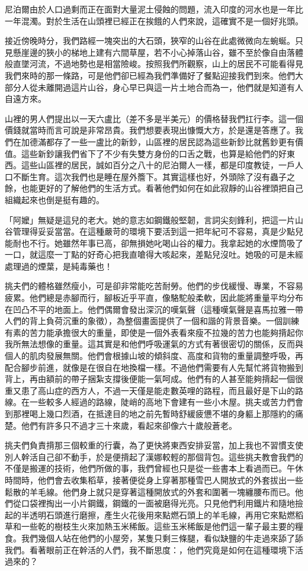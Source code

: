 尼泊爾由於人口過剩而正在面對大量泥土侵蝕的問題，流入印度的河水也是一年比一年混濁。對於生活在山頭裡已經正在挨餓的人們來說，這確實不是一個好兆頭。

接近傍晚時分，我們路經一塊突出的大石頭，狹窄的山谷在此處微微向左蜿蜒。只見懸崖邊的狹小的梯地上建有六間草屋，若不小心掉落山谷，雖不至於像自由落體般直墜河流，不過地勢也是相當險峻。按照我們所觀察，山上的居民不可能看得見我們來時的那一條路，可是他們卻已經為我們準備好了餐點迎接我們到來。他們大部分人從未離開過這片山谷，身心早已與這一片土地合而為一，他們就是知道有人自遠方來。

山裡的男人們提出以一天六盧比（差不多是半美元）的價格替我們扛行李。這一個價錢就當時而言可說是非常昂貴。我們想要表現出慷慨大方，於是還是答應了。我們在加德滿都存了一些一盧比的新鈔，山區裡的居民認為這些新鈔比就舊鈔更有價值。這些新鈔讓我們省下了不少有失雙方身份的口舌之戰，也算是給他們的好東西。這些山區裡的居民，誠如百分之八十的尼泊爾人一樣，都是印度教徒，一戶人口不斷生育。這次我們也是睡在屋外簷下。其實這樣也好，外頭除了沒有蟲子之餘，也能更好的了解他們的生活方式。看著他們如何在如此寂靜的山谷裡頭把自己組織起來也倒是挺有趣的。


「阿嬤」無疑是這兒的老大。她的意志如鋼鐵般堅韌，言詞尖刻鋒利，把這一片山谷管理得妥妥當當。在這種嚴苛的環境下要活到這一把年紀可不容易，真是少點兒能耐也不行。她雖然年事已高，卻無損她叱喝山谷的權力。我拿起她的水煙筒吸了一口，就這麼一丁點的好奇心把我直嗆得大咳起來，差點兒沒吐。她吸的可是未經處理過的煙葉，是純毒藥也！

挑夫們的體格雖然瘦小，可是卻非常能吃苦耐勞。他們的步伐緩慢、專業，不容易疲累。他們總是赤腳而行，腳板近乎平直，像駱駝般柔軟，因此能將重量平均分布在凹凸不平的地面上。他們偶爾會發出深沉的嘆氣聲（這種嘆氣聲是喜馬拉雅一帶人們的背上負荷沉重的象徵），為整個畫面提供了一個和諧的背景音樂。一個訓練有素的苦力能承擔很大的重量，即使是一個外表看來瘦不拉幾的苦力也能夠揹起你我所無法想像的重量。這其實是和他們呼吸運氣的方式有著很密切的關係，反而與個人的肌肉發展無關。他們會根據山坡的傾斜度、高度和貨物的重量調整呼吸，再配合腳步前進，就像是在很自在地換檔一樣。不過他們需要有人先幫忙將貨物搬到背上，再由額前的帶子捆紮支撐後便能一氣呵成。他們有的人甚至能夠揹起一個很重又患了高山症的西方人，不過一天僅是能走數英哩的路程，而且最好是下山的路線。在一些較多人經過的路線，陡峭的高地下會建有一些小木屋。挑夫或苦力們會到那裡喝上幾口烈酒，在抵達目的地之前先暫時舒緩疲憊不堪的身軀上那隱約的痛楚。他們有許多只不過才三十來歲，看起來卻像六十歲般蒼老。

挑夫們負責揹那三個較重的行囊，為了更快將東西安排妥當，加上我也不習慣支使別人幹活自己卻不動手，於是便揹起了漢娜較輕的那個背包。這些挑夫教會我們的不僅是搬運的技術，他們所做的事，我們曾經也只是從一些書本上看過而已。午休時間時，他們會去收集稻草，接著便從身上穿著那種雪巴人開放式的外套拔出一些鬆散的羊毛線。他們身上就只是穿著這種開放式的外套和圍著一塊纏腰布而已。他們從口袋裡掏出一小片鋼鐵，鋼鐵的一面被磨得光亮。只見他們利用鐵片和隨地撿起的半透明石頭進行磨擦，產生火花後用來點燃石頭上的羊毛線，再用它來點燃稻草和一些乾的樹枝生火來加熱玉米稀飯。這些玉米稀飯是他們這一輩子最主要的糧食。我們幾個人站在他們的小屋旁，某隻只剩三條腿，看似缺鹽的牛走過來舔了舔我們。看著眼前正在幹活的人們，我不斷思度：，他們究竟是如何在這種環境下活過來的？

